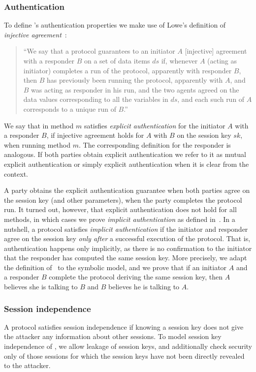 \spacehack
\subsubsection{Authentication}
To define \mEdhoc{}'s authentication properties we make use of Lowe's definition
of \emph{injective agreement}~\cite{DBLP:conf/csfw/Lowe97a}:
\begin{quote}
  ``We say that a protocol guarantees to an initiator $A$ [injective] agreement
  with a responder $B$ on a set of data items $ds$ if, whenever $A$ (acting as
  initiator) completes a run of the protocol, apparently with responder $B$,
  then $B$ has previously been running the protocol, apparently with $A$, and
  $B$ was acting as responder in his run, and the two agents agreed on the data
  values corresponding to all the variables in $ds$, and each such run of $A$
  corresponds to a unique run of $B$.''
\end{quote}
%
We say that \mEdhoc{} in method $m$ satisfies \emph{explicit authentication} for
the initiator $A$ with a responder $B$, if injective agreement holds for $A$
with $B$ on the session key $sk$, when running method $m$.
%
The corresponding definition for the responder is analogous.
%
If both parties obtain explicit authentication we refer to it as mutual explicit
authentication or simply explicit authentication when it is clear from the
context.

A party obtains the explicit authentication guarantee when both parties agree
on the session key (and other parameters), when the party completes the protocol
run.
%
It turned out, however, that explicit authentication does not hold for all
\mEdhoc{} methods, in which cases we prove \emph{implicit authentication} as
defined in~\cite{DBLP:journals/iacr/GuilhemFW19}.
%
In a nutshell, a protocol satisfies \emph{implicit authentication} if the
initiator and responder agree on the session key \emph{only after} a successful
execution of the protocol.
%
That is, authentication happens only implicitly, as there is no confirmation to
the initiator that the responder has computed the same session key.
%
More precisely, we adapt the definition of~\cite{DBLP:journals/iacr/GuilhemFW19}
to the symbolic model, and we prove that if an initiator $A$ and a responder $B$
complete the protocol deriving the same session key, then $A$ believes she is
talking to $B$ and $B$ believes he is talking to $A$.

\spacehack
\subsubsection{Session independence}
A protocol satisfies session independence if knowing a session key does
not give the attacker any information about other sessions.  To model session
key independence of \mEdhoc, we allow leakage of session keys, and additionally
check security only of those sessions for which the session keys have not been
directly revealed to the attacker.

